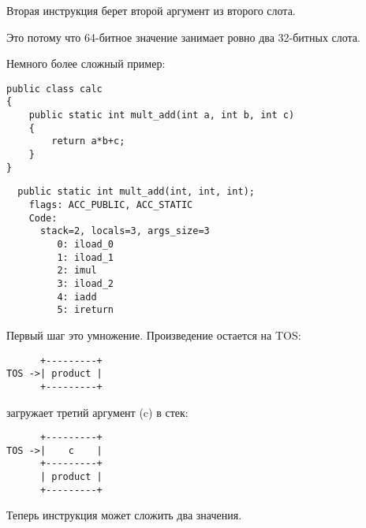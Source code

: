 Вторая инструкция  берет второй аргумент из второго слота.

Это потому что 64-битное значение  занимает ровно два 32-битных слота.


Немного более сложный пример:

\begin{lstlisting}[style=customjava]
public class calc
{
	public static int mult_add(int a, int b, int c)
	{
		return a*b+c;
	}
}
\end{lstlisting}

\begin{lstlisting}
  public static int mult_add(int, int, int);
    flags: ACC_PUBLIC, ACC_STATIC
    Code:
      stack=2, locals=3, args_size=3
         0: iload_0       
         1: iload_1       
         2: imul          
         3: iload_2       
         4: iadd          
         5: ireturn       
\end{lstlisting}


Первый шаг это умножение. Произведение остается на \ac{TOS}:

\begin{lstlisting}
      +---------+
TOS ->| product |
      +---------+
\end{lstlisting}

 загружает третий аргумент (c) в стек:

\begin{lstlisting}
      +---------+
TOS ->|    c    |
      +---------+
      | product |
      +---------+
\end{lstlisting}


Теперь инструкция  может сложить два значения.
